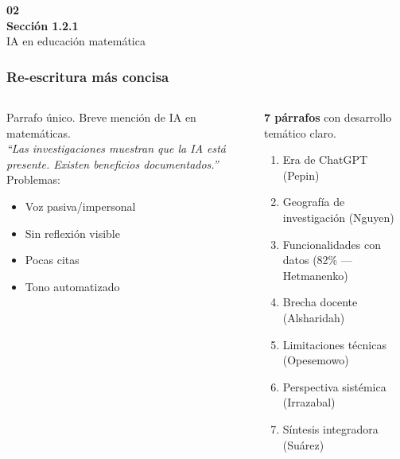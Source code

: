 \documentclass[11pt, aspectratio=169, spanish]{beamer}
\begin{document}
\begin{frame}[plain]
\vspace*{1.0cm}
\begin{center}
{\fontsize{40}{48}\selectfont\textcolor{VerdeUNAL!40}{\textbf{02}}}\\[-0.1cm]
{\Large\textbf{Sección 1.2.1}}\\[0.05cm]
{\normalsize\textcolor{GrisClaro!80!black}{IA en educación matemática}}
\end{center}
\end{frame}

\begin{frame}[plain, shrink=18]
\frametitle{\faPencilAlt\quad Re-escritura más concisa}
\vspace{0.05cm}

\begin{columns}[T]

\begin{tcolorbox}[colback=RojoAlerta!7, colframe=RojoAlerta!50, arc=2mm,
  title={\centering\footnotesize\textbf{\faTimesCircle\quad Primer Avance}}]
{\tiny
Parrafo único. Breve mención de IA en matemáticas.\\[0.06cm]

\textit{``Las investigaciones muestran que la IA está presente. Existen beneficios documentados.''}\\[0.06cm]

Problemas:
\begin{itemize}[itemsep=1pt, leftmargin=10pt]
\item Voz pasiva/impersonal
\item Sin reflexión visible
\item Pocas citas
\item Tono automatizado
\end{itemize}
}
\end{tcolorbox}


\begin{tcolorbox}[colback=VerdeOk!7, colframe=VerdeOk!50, arc=2mm,
  title={\centering\footnotesize\textbf{\faCheckCircle\quad Segundo Avance}}]
{\tiny
\textbf{7 párrafos} con desarrollo temático claro.\\[0.06cm]

\begin{enumerate}[label=P\arabic*., itemsep=0pt, leftmargin=12pt, font=\scriptsize\bfseries]
\item Era de ChatGPT (Pepin)
\item Geografía de investigación (Nguyen)
\item Funcionalidades con datos (82\% --- Hetmanenko)
\item Brecha docente (Alsharidah)
\item Limitaciones técnicas (Opesemowo)
\item Perspectiva sistémica (Irrazabal)
\item Síntesis integradora (Suárez)
\end{enumerate}

}
\end{tcolorbox}
\end{columns}
\end{frame}
\end{document}

